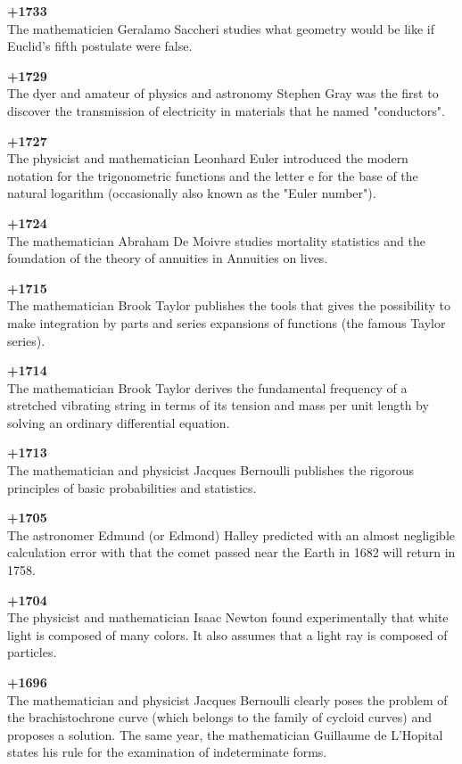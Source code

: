 \pagebreak
\textbf{+1733}\\
The mathematicien Geralamo Saccheri studies what geometry would be like if Euclid's fifth postulate were false.

\textbf{+1729}\\
The dyer and amateur of physics and astronomy Stephen Gray was the first to discover the transmission of electricity in materials that he named "conductors".

\textbf{+1727}\\
The physicist and mathematician Leonhard Euler introduced the modern notation for the trigonometric functions and the letter e for the base of the natural logarithm (occasionally also known as the "Euler number").

\textbf{+1724}\\
The mathematician Abraham De Moivre studies mortality statistics and the foundation of the theory of annuities in Annuities on lives.

\textbf{+1715}\\
The mathematician Brook Taylor publishes the tools that gives the possibility to make integration by parts and series expansions of functions (the famous Taylor series).

\textbf{+1714}\\
The mathematician Brook Taylor derives the fundamental frequency of a stretched vibrating string in terms of its tension and mass per unit length by solving an ordinary differential equation.

\textbf{+1713}\\
The mathematician and physicist Jacques Bernoulli publishes the rigorous principles of basic probabilities and statistics.

\textbf{+1705}\\
The astronomer Edmund (or Edmond) Halley predicted with an almost negligible calculation error with that the comet passed near the Earth in 1682 will return in 1758.

\textbf{+1704}\\
The physicist and mathematician Isaac Newton found experimentally that white light is composed of many colors. It also assumes that a light ray is composed of particles.

\textbf{+1696}\\
The mathematician and physicist Jacques Bernoulli clearly poses the problem of the brachistochrone curve (which belongs to the family of cycloid curves) and proposes a solution. The same year, the mathematician Guillaume de L'Hopital states his rule for the examination of indeterminate forms.

